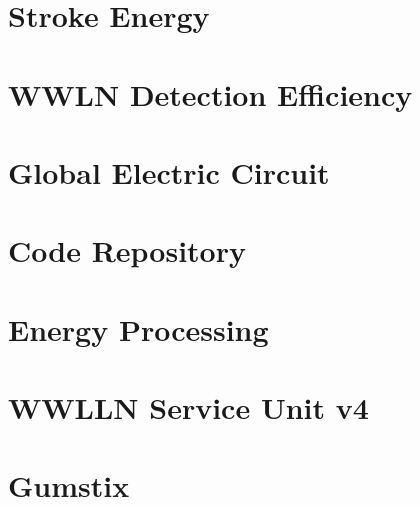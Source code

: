 \documentclass [11pt, twoside] {uwthesis}[2012/06/19]
\begin{document}
 
\chapter{Stroke Energy}




\chapter{WWLN Detection Efficiency}



 
\chapter{Global Electric Circuit}



%
%





%
%

\appendix
\raggedbottom\sloppy
 

\chapter{Code Repository}



\chapter{Energy Processing}



\chapter{WWLLN Service Unit v4}



\chapter{Gumstix}



\end{document}
